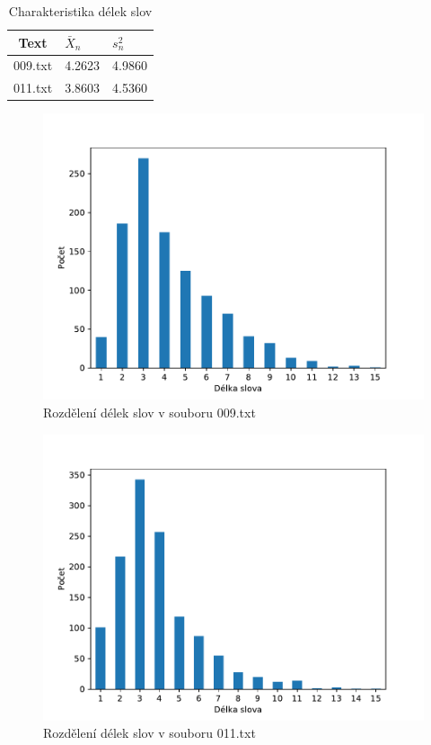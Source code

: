 \documentclass[12pt]{article}
\begin{document}
	\begin{table}[!ht]
\centering
\begin{tabular}{ | c | l | l | } \hline
Text	& $\bar{X}_n$ & $s_n^2$ \\ \hline
009.txt & 4.2623 & 4.9860 \\  \hline
011.txt & 3.8603 & 4.5360 \\ \hline
\end{tabular}
\caption{Charakteristika délek slov}
\label{stat-table}
\end{table}

\begin{figure}[!ht]
  \centering
       \includegraphics[width=1.0\textwidth]{hw2_plot1_009.pdf}
        \caption{Rozdělení délek slov v souboru 009.txt}
        \label{009_graph}
  \end{figure}
\begin{figure}[!ht]
  \centering
       \includegraphics[width=1.0\textwidth]{hw2_plot1_011.pdf}
        \caption{Rozdělení délek slov v souboru 011.txt}
        \label{011_graph}
  \end{figure}
\end{document}
